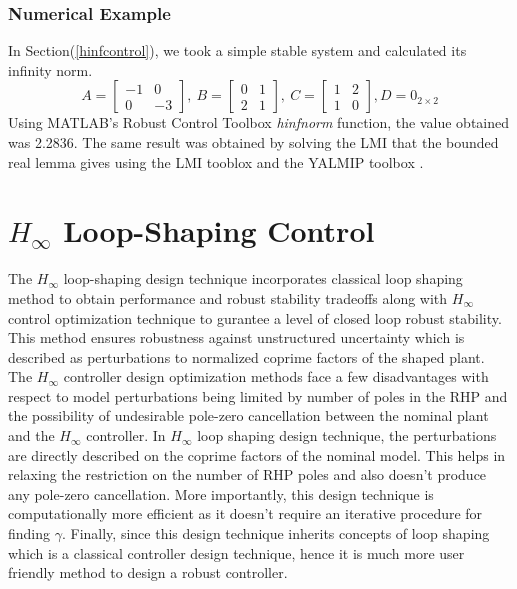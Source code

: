 \documentclass[a4paper,12pt]{article}
\begin{document}
	\subsubsection{Numerical Example}
	In Section(\ref{hinfcontrol}), we took a simple stable system and calculated its infinity norm.
		\[A=\begin{bmatrix}
		-1 & 0 \\
		0 & -3
		\end{bmatrix}
		,\:B=\begin{bmatrix}
		0 & 1 \\
		2 & 1
		\end{bmatrix}
		,\:C=\begin{bmatrix}
		1 & 2 \\ 1 & 0
		\end{bmatrix}
		, D= 0_{2 \times 2}
		\]
		Using MATLAB's Robust Control Toolbox \textit{hinfnorm} function, the value obtained was 2.2836. The same result was obtained by solving the LMI that the bounded real lemma gives using the LMI tooblox and the YALMIP toolbox \cite{yalmip}. 
\section{$H_{\infty}$ Loop-Shaping Control} 
The $H_{\infty}$ loop-shaping design technique incorporates classical loop shaping method to obtain performance and robust stability tradeoffs along with $H_{\infty}$ control optimization technique to gurantee a level of closed loop robust stability. This method ensures robustness against unstructured uncertainty which is described as perturbations to normalized coprime factors of the shaped plant.\\
The $H_{\infty}$ controller design optimization methods face a few disadvantages with respect to model perturbations being limited by number of poles in the RHP and the possibility of undesirable pole-zero cancellation between the nominal plant and the $H_{\infty}$ controller. In $H_{\infty}$ loop shaping design technique, the perturbations are directly described on the coprime factors of the nominal model. This helps in relaxing the restriction on the number of RHP poles and also doesn't produce any pole-zero cancellation. More importantly, this design technique is computationally more efficient as it doesn't require an iterative procedure for finding $\gamma$. Finally, since this design technique inherits concepts of loop shaping which is a classical controller design technique, hence it is much more user friendly method to design a robust controller.
\end{document}
